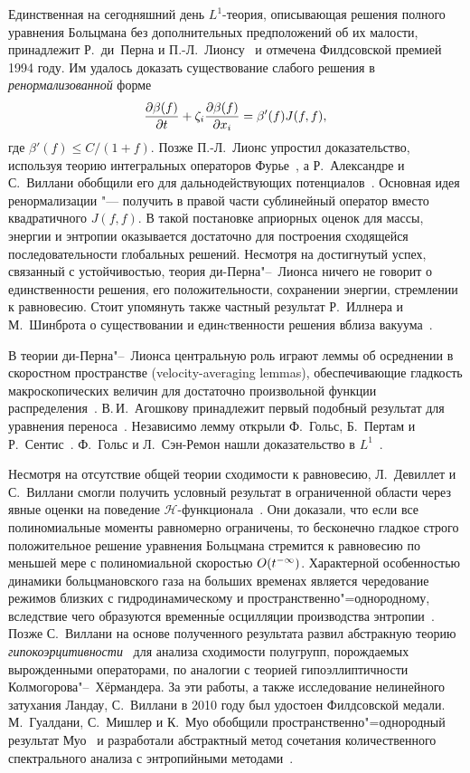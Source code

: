 Единственная на сегодняшний день \(L^1\)-теория, описывающая решения полного уравнения Больцмана без
дополнительных предположений об их малости, принадлежит Р.~ди~Перна и П.-Л.~Лионсу~\cite{Lions1989}
и отмечена Филдсовской премией 1994 году.
Им удалось доказать существование слабого решения в \emph{ренормализованной} форме
\begin{equation*}
    \pder[\beta(f)]{t} + \zeta_i\pder[\beta(f)]{x_i} = \beta'(f)J(f,f),
\end{equation*}
где \(\beta'(f) \leq C/(1+f)\).
Позже П.-Л.~Лионс упростил доказательство, используя теорию интегральных операторов Фурье~\cite{Lions1994},
а Р.~Александре и С.~Виллани обобщили его для дальнодействующих потенциалов~\cite{Alexandre2002}.
Основная идея ренормализации "--- получить в правой части сублинейный оператор вместо квадратичного \(J(f,f)\).
В такой постановке априорных оценок для массы, энергии и энтропии оказывается достаточно
для построения сходящейся последовательности глобальных решений.
Несмотря на достигнутый успех, связанный с устойчивостью, теория ди-Перна"--~Лионса ничего не говорит о
единственности решения, его положительности, сохранении энергии, стремлении к равновесию.
Стоит упомянуть также частный результат Р.~Иллнера и М.~Шинброта о существовании и единcтвенности решения вблиза вакуума~\cite{Illner1984}.

В теории ди-Перна"--~Лионса центральную роль играют леммы об осреднении в скоростном пространстве (velocity-averaging lemmas),
обеспечивающие гладкость макроскопических величин для достаточно произвольной функции распределения~\cite{Sentis1988}.
В.\,И.~Агошкову принадлежит первый подобный результат для уравнения переноса~\cite{Agoshkov1984}.
Независимо лемму открыли Ф.~Гольс, Б.~Пертам и Р.~Сентис~\cite{Sentis1985}.
Ф.~Гольс и Л.~Сэн-Ремон нашли доказательство в \(L^1\)~\cite{Raymond2002}.

Несмотря на отсутствие общей теории сходимости к равновесию,
Л.~Девиллет и С.~Виллани смогли получить условный результат в ограниченной области
через явные оценки на поведение \(\mathcal{H}\)-функционала~\cite{Villani2005}.
Они доказали, что если все полиномиальные моменты равномерно ограничены,
то бесконечно гладкое строго положительное решение уравнения Больцмана стремится к равновесию
по меньшей мере с полиномиальной скоростью \(\OO{t^{-\infty}}\).
Характерной особенностью динамики больцмановского газа на больших временах является чередование режимов
близких с гидродинамическому и пространственно"=однородному, вследствие чего
образуются временн\'{ы}е осцилляции производства энтропии~\cite{Filbet2006}.
Позже С.~Виллани на основе полученного результата развил абстракную теорию \emph{гипокоэрцитивности}~\cite{Villani2009}
для анализа сходимости полугрупп, порождаемых вырожденными операторами,
по аналогии с теорией гипоэллиптичности Колмогорова"--~Хёрмандера.
За эти работы, а также исследование нелинейного затухания Ландау, С.~Виллани в 2010 году был удостоен Филдсовской медали.
М.~Гуалдани, С.~Мишлер и К.~Муо обобщили пространственно"=однородный результат Муо~\cite{Mouhot2006}
и разработали абстрактный метод сочетания количественного спектрального анализа с энтропийными методами~\cite{Gualdani2013}.

